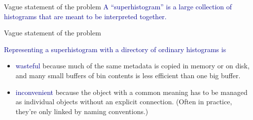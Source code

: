 \documentclass[aspectratio=169]{beamer}
\begin{document}
\begin{frame}{Vague statement of the problem}
\vspace{0.5 cm}
\Large
\textcolor{darkblue}{A ``superhistogram'' is a large collection of histograms that are meant to be interpreted together.}
\end{frame}

\begin{frame}{Vague statement of the problem}
\vspace{0.5 cm}
\large

\textcolor{darkblue}{Representing a superhistogram with a directory of ordinary histograms is}

\vspace{0.5 cm}
\begin{itemize}\setlength{\itemsep}{0.5 cm}
\item \textcolor{darkblue}{wasteful} because much of the same metadata is copied in memory or on disk, and many small buffers of bin contents is less efficient than one big buffer.

\item \textcolor{darkblue}{inconvenient} because the object with a common meaning has to be managed as individual objects without an explicit connection. (Often in practice, they're only linked by naming conventions.)
\end{itemize}
\end{frame}
\end{document}
